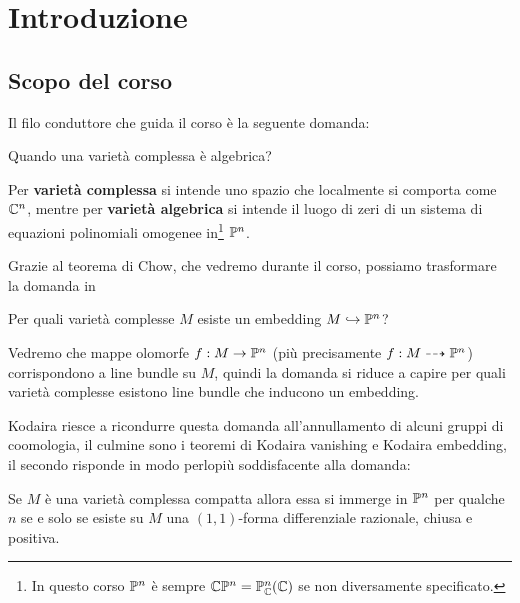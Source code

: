 \chapter*{Introduzione}


\section*{Scopo del corso}
Il filo conduttore che guida il corso \`e la seguente domanda:
\begin{center}
Quando una variet\`a complessa \`e algebrica?
\end{center}

Per \textbf{variet\`a complessa} si intende uno spazio che localmente si comporta come $\mathbb{C}^n$, mentre per \textbf{variet\`a algebrica} si intende il luogo di zeri di un sistema di equazioni polinomiali omogenee in\footnote{In questo corso $\mathbb{P}^n$ \`e sempre $\mathbb{C}\mathbb{P}^n=\mathbb{P}^n_{\mathbb{C}}(\mathbb{C})$ se non diversamente specificato.} $\mathbb{P}^n$.

\medskip

Grazie al teorema di Chow, che vedremo durante il corso, possiamo trasformare la domanda in
\begin{center}
    Per quali variet\`a complesse $M$ esiste un embedding $M\hookrightarrow \mathbb{P}^n$?
\end{center}

Vedremo che mappe olomorfe $f:M\to \mathbb{P}^n$ (pi\`u precisamente $f:M\dashrightarrow \mathbb{P}^n$) corrispondono a line bundle su $M$, quindi la domanda si riduce a capire per quali variet\`a complesse esistono line bundle che inducono un embedding.

\bigskip

Kodaira riesce a ricondurre questa domanda all'annullamento di alcuni gruppi di coomologia, il culmine sono i teoremi di Kodaira vanishing e Kodaira embedding, il secondo risponde in modo perlopi\`u soddisfacente alla domanda:
\begin{theorem}
Se $M$ \`e una variet\`a complessa compatta allora essa si immerge in $\mathbb{P}^n$ per qualche $n$ se e solo se esiste su $M$ una $(1,1)$-forma differenziale razionale, chiusa e positiva.
\end{theorem}
